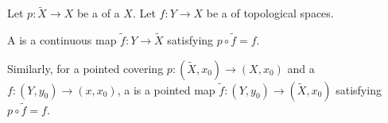 \begin{definition} \label{definition:lift_of_a_continuous_map_under_a_covering_of_topological_spaces}
Let $p: \tilde{X} \to X$ be a  of a  $X$. Let $f: Y \to X$ be a  of topological spaces.

A  is a continuous map $\tilde{f}: Y \to \tilde{X}$ satisfying $p \circ \tilde{f} = f$. 

Similarly, for a pointed covering $p:(\tilde{X}, x_0) \to (X,x_0)$ and a  $f:(Y,y_0) \to (x,x_0)$, a  is a pointed map $\tilde{f}: (Y,y_0) \to (\tilde{X},x_0)$ satisfying $p \circ \tilde{f} = f$.
\end{definition}